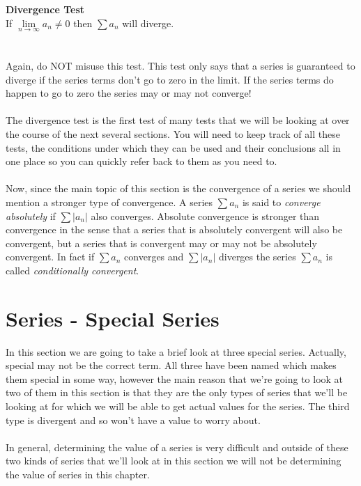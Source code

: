 \documentclass[10pt,reqno]{book}
\theoremstyle{definition}
\begin{document}
	\textbf{Divergence Test}\\
	If $ \lim\limits_{n \to \infty} a_n \neq 0 $ then $ \sum a_n $ will diverge.\\ \\ \\
	Again, do NOT misuse this test. This test only says that a series is guaranteed to diverge if the series terms don’t go to zero in the limit. If the series terms do happen to go to zero the series may or may not converge!\\ \\
	The divergence test is the first test of many tests that we will be looking at over the course of the next several sections. You will need to keep track of all these tests, the conditions under which they can be used and their conclusions all in one place so you can quickly refer back to them as you need to.\\ \\
	Now, since the main topic of this section is the convergence of a series we should mention a stronger type of convergence. A series $ \sum a_n $ is said to \textit{converge absolutely} if $ \sum |a_n| $ also converges. Absolute convergence is stronger than convergence in the sense that a series that is absolutely convergent will also be convergent, but a series that is convergent may or may not be absolutely convergent. In fact if $ \sum a_n $ converges and $ \sum |a_n| $ diverges the series $ \sum a_n $ is called \textit{conditionally convergent}.
	
	\section{Series - Special Series}
	
	
	In this section we are going to take a brief look at three special series.  Actually, special may not be the correct term. All three have been named which makes them special in some way, however the main reason that we're going to look at two of them in this section is that they are the only types of series that we'll be looking at for which we will be able to get actual values for the series. The third type is divergent and so won't have a value to worry about.\\ \\
	In general, determining the value of a series is very difficult and outside of these two kinds of series that we'll look at in this section we will not be determining the value of series in this chapter.
	
\end{document}
